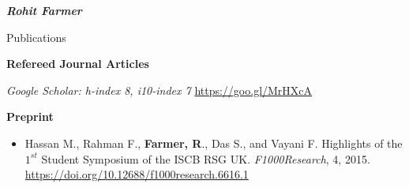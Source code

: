 \documentclass[10pt]{article}
\begin{document}
\begin{cv}{\huge \it \bfseries Rohit Farmer}
\begin{cvlist}{Publications}
\vskip3pt
\item {\bf Refereed Journal Articles}
\item {\textit{Google Scholar: h-index 8, i10-index 7} \url{https://goo.gl/MrHXcA}}
\vskip3pt
\item{ }


\vskip3pt
\item {\textbf{Preprint}}
\item {\begin{itemize}\item Hassan M.,  Rahman F., \textbf{Farmer, R}., Das S., and Vayani F. Highlights of the $1^{st}$ Student Symposium of the ISCB RSG UK. \emph{F1000Research}, 4, 2015. \url{https://doi.org/10.12688/f1000research.6616.1} \end{itemize}}

\end{cvlist}
\end{cv}
\end{document}
